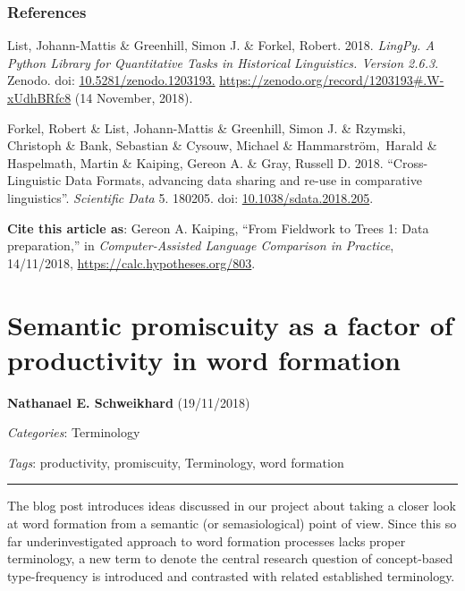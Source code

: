 \documentclass[
  english,
  a4paper,
  oneside,tablecaptionabove
]{scrbook}
\begin{document}
\hypertarget{references}{\subsection*{References}\label{references}}

List, Johann-Mattis \& Greenhill, Simon J. \& Forkel, Robert. 2018.
\emph{LingPy. A Python Library for Quantitative Tasks in Historical
Linguistics. Version 2.6.3}. Zenodo. doi:
\href{https://doi.org/10.5281/zenodo.1203193.}{10.5281/zenodo.1203193.}
\url{https://zenodo.org/record/1203193\#.W-xUdhBRfc8} (14 November,
2018).

Forkel, Robert \& List, Johann-Mattis \& Greenhill, Simon J. \&
Rzymski, Christoph \& Bank, Sebastian \& Cysouw, Michael \&
Hammarström,~Harald \& Haspelmath, Martin \& Kaiping, Gereon A. \& Gray,
Russell D. 2018. ``Cross-Linguistic Data Formats, advancing data sharing
and re-use in comparative linguistics''. \emph{Scientific Data} 5. 180205.
doi:
\href{https://doi.org/10.1038/sdata.2018.205}{10.1038/sdata.2018.205}.

\textbf{Cite this article as}: Gereon A. Kaiping, ``From Fieldwork to
Trees 1: Data preparation,'' in \emph{Computer-Assisted Language
Comparison in Practice}, 14/11/2018,
\url{https://calc.hypotheses.org/803}.

\hypertarget{semantic-promiscuity-as-a-factor-of-productivity-in-word-formation}{%
\chapter{Semantic promiscuity as a factor of productivity in word
formation}\label{semantic-promiscuity-as-a-factor-of-productivity-in-word-formation}}

\textbf{Nathanael E. Schweikhard} (19/11/2018)

\emph{Categories}: Terminology

\emph{Tags}: productivity, promiscuity, Terminology, word formation

\begin{center}\rule{0.5\linewidth}{\linethickness}\end{center}

The blog post introduces ideas discussed in our project about taking a
closer look at word formation from a semantic (or semasiological) point
of view. Since this so far underinvestigated approach to word formation
processes lacks proper terminology, a new term to denote the central
research question of concept-based type-frequency is introduced and
contrasted with related established terminology.
\end{document}
